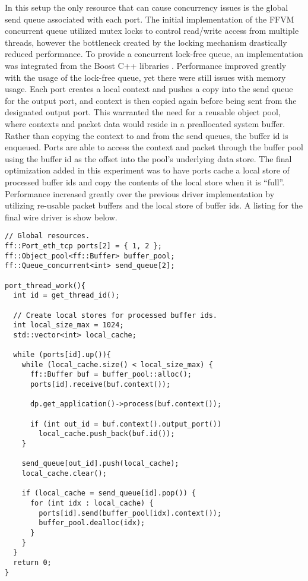 In this setup the only resource that can cause concurrency issues is the global
send queue associated with each port. The initial implementation of the FFVM
concurrent queue utilized mutex locks to control read/write access from multiple
threads, however the bottleneck created by the locking mechanism drastically
reduced performance. To provide a concurrent lock-free queue, an implementation
was integrated from the Boost C++ libraries \cite{boost}. Performance improved
greatly with the usage of the lock-free queue, yet there were still issues with
memory usage. Each port creates a local context and pushes a copy into the
send queue for the output port, and context is then copied again before being
sent from the designated output port. This warranted the need for a reusable
object pool, where contexts and packet data would reside in a preallocated
system buffer. Rather than copying the context to and from the send queues, the
buffer id is enqueued. Ports are able to access the context and packet through
the buffer pool using the buffer id as the offset into the pool's underlying
data store. The final optimization added in this experiment was to have ports
cache a local store of processed buffer ids and copy the contents of the local
store when it is ``full''. Performance increased greatly over the previous driver
implementation by utilizing re-usable packet buffers and the local store of
buffer ids. A listing for the final wire driver is show below.

\begin{lstlisting}
// Global resources.
ff::Port_eth_tcp ports[2] = { 1, 2 };
ff::Object_pool<ff::Buffer> buffer_pool;
ff::Queue_concurrent<int> send_queue[2];

port_thread_work(){
  int id = get_thread_id();

  // Create local stores for processed buffer ids.
  int local_size_max = 1024;
  std::vector<int> local_cache;

  while (ports[id].up()){
    while (local_cache.size() < local_size_max) {
      ff::Buffer buf = buffer_pool::alloc();
      ports[id].receive(buf.context());

      dp.get_application()->process(buf.context());

      if (int out_id = buf.context().output_port())
        local_cache.push_back(buf.id());
    }

    send_queue[out_id].push(local_cache);
    local_cache.clear();

    if (local_cache = send_queue[id].pop()) {
      for (int idx : local_cache) {
        ports[id].send(buffer_pool[idx].context());
        buffer_pool.dealloc(idx);
      }
    }
  }
  return 0;
}
\end{lstlisting}


